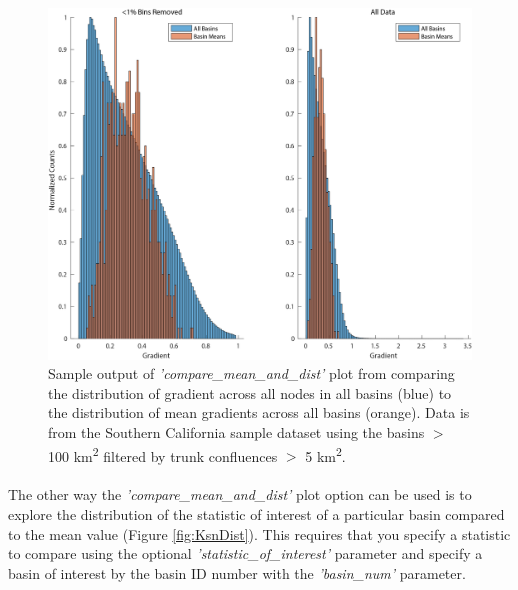 \begin{figure}[H]
	\centering
	\includegraphics[width=12cm]{PNGs/Gradient_Dist.png}
	\caption{Sample output of \textit{'compare\_mean\_and\_dist'} plot from  comparing the distribution of gradient across all nodes in all basins (blue) to the distribution of mean gradients across all basins (orange). Data is from the Southern California sample dataset using the basins $>$ 100 km\textsuperscript{2}  filtered by trunk confluences $>$ 5 km\textsuperscript{2}.}
	\label{fig:GradDist}
\end{figure}

\paragraph{}The other way the \textit{'compare\_mean\_and\_dist'}  plot option can be used is to explore the distribution of the statistic of interest of a particular basin compared to the mean value (Figure \ref{fig:KsnDist}). This requires that you specify a statistic to compare using the optional \textit{'statistic\_of\_interest'} parameter and specify a basin of interest by the basin ID number with the \textit{'basin\_num'} parameter.


